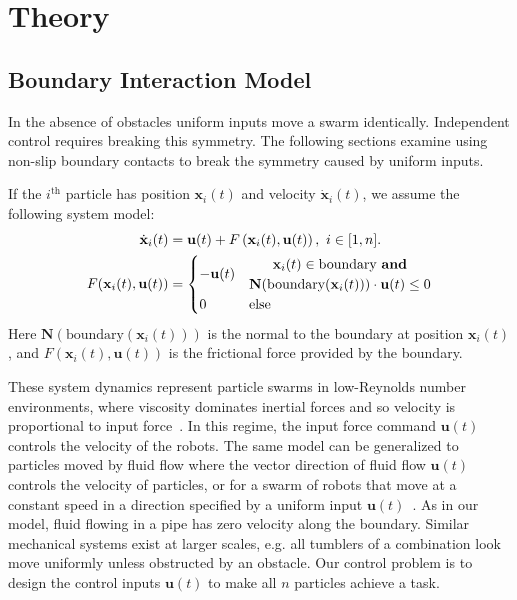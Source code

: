\section{Theory}
\label{sec:theory}

\subsection{Boundary Interaction Model}\label{subsec:WallFriction}

In the absence of obstacles uniform inputs move a swarm identically.  
Independent control requires breaking this symmetry. 
The following sections examine using non-slip boundary contacts to break the symmetry caused by uniform inputs.  
 
 If the $i^{\textrm{th}}$ particle has position $\mathbf{x}_i(t)$ and velocity $\dot{\mathbf{x}}_i(t)$,  we assume the following system model:
 \begin{align}\label{eq:swarmDynamicsAndFric} 
\dot{\mathbf{x}}_i(t)
 &=
 \mathbf{u}(t)
 +F \left( \mathbf{x}_i(t), \mathbf{u}(t) \right), ~i \in [1,n].\\
 F(\mathbf{x}_i(t), \mathbf{u}(t)) &= \begin{cases}
  - \mathbf{u}(t) &\begin{matrix} \mathbf{x}_i(t) \in  \textrm{boundary \textbf{and}}\\
\mathbf{N}(\textrm{boundary$(\mathbf{x}_i(t))$})\cdot   \mathbf{u}(t) \le 0 \end{matrix}
 \\
 0 & \textrm{else} 
 \end{cases}\nonumber
 \end{align}
 Here $\mathbf{N}(\textrm{boundary$(\mathbf{x}_i(t))$})$ is the normal to the boundary at position $\mathbf{x}_i(t)$, and
 $F(\mathbf{x}_i(t), \mathbf{u}(t)) $ is the frictional force provided by the boundary.
 
 
These system dynamics represent particle swarms in low-Reynolds number environments, where viscosity dominates inertial forces and so velocity is proportional to input force~\cite{Purcell1977}. 
 In this regime, the input force command $\mathbf{u}(t)$ controls the velocity of the robots.  
  The same model can be generalized to particles moved by fluid flow where the vector direction of fluid flow $\mathbf{u}(t)$ controls the velocity of particles, or for a swarm of robots that move at a constant speed in a direction specified by a uniform input $\mathbf{u}(t)$~\cite{Rubenstein2012}.
  As in our model, fluid flowing in a pipe has zero velocity along the boundary. Similar mechanical systems exist at larger scales, e.g. all tumblers of a combination look move uniformly unless obstructed by an obstacle.
 Our control problem is to design the control inputs $\mathbf{u}(t)$ to make all $n$ particles achieve a task.
 
